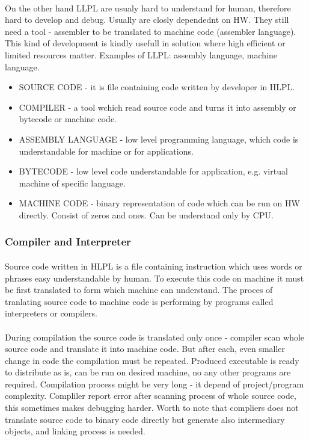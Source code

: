 \documentclass{article}
\begin{document}
	\paragraph{}
	On the other hand LLPL are usualy hard to understand for human, therefore hard to develop and debug. Usually are closly dependednt on HW. They still need a tool - assembler to be translated to machine code (assembler language). This kind of development is kindly usefull in solution where high efficient or limited resources matter. Examples of LLPL: assembly language, machine language.
	\begin{itemize}
	\item SOURCE CODE - it is file containing code written by developer in HLPL.
	\item COMPILER - a tool wchich read source code and turns it into assembly or bytecode or machine code.
	\item ASSEMBLY LANGUAGE - low level programming language, which code is understandable for machine or for applications.
	\item BYTECODE - low level code understandable for application, e.g. virtual machine of specific language.
	\item MACHINE CODE - binary representation of code which can be run on HW directly. Consist of zeros and ones. Can be understand only by CPU. 
	\end{itemize}
	\subsubsection{Compiler and Interpreter}
	\paragraph{}
	Source code written in HLPL is a file containing instruction which uses words or phrases easy understandable by human. To execute this code on machine it must be first translated to form which machine can understand. The proces of tranlating source code to machine code is performing by programs called interpreters or compilers.
	\paragraph{}
	During compilation the source code is translated only once - compiler scan whole source code and translate it into machine code. But after each, even smaller change in code the compilation must be repeated. Produced executable is ready to distribute as is, can be run on desired machine, no any other programs are required. Compilation process might be very long - it depend of project/program complexity. Compliler report error after scanning process of whole source code, this sometimes makes debugging harder. Worth to note that compliers does not translate source code to binary code directly but generate also intermediary objects, and linking process is needed.
\end{document}
